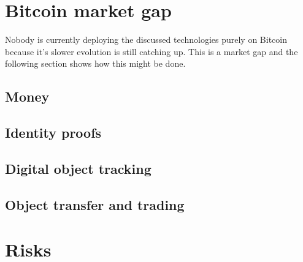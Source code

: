\section{Bitcoin market gap}
Nobody is currently deploying the discussed technologies purely on Bitcoin because it's slower evolution is still catching up. This is a market gap and the following section shows how this might be done.
\subsection{Money}
\lipsum[50]
\subsection{Identity proofs}
\lipsum[50]
\subsection{Digital object tracking}
\lipsum[50]
\subsection{Object transfer and trading}
\lipsum[50]
\section{Risks}